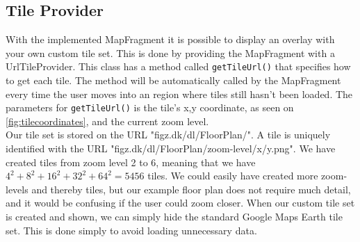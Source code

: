 \subsection*{Tile Provider}
With the implemented MapFragment it is possible to display an overlay with your own custom tile set. This is done by providing the MapFragment with a UrlTileProvider\citep{tilecoordinates}. This class has a method called \lstinline|getTileUrl()| that specifies how to get each tile. The method will be automatically called by the MapFragment every time the user moves into an region where tiles still hasn't been loaded. The parameters for \lstinline|getTileUrl()| is the tile's x,y coordinate, as seen on \autoref{fig:tilecoordinates}, and the current zoom level.\\
Our tile set is stored on the URL "figz.dk/dl/FloorPlan/". A tile is uniquely identified with the URL "figz.dk/dl/FloorPlan/zoom-level/x/y.png". We have created tiles from zoom level 2 to 6, meaning that we have $4^2+8^2+16^2+32^2+64^2 = 5456$ tiles. We could easily have created more zoom-levels and thereby tiles, but our example floor plan does not require much detail, and it would be confusing if the user could zoom closer. When our custom tile set is created and shown, we can simply hide the standard Google Maps Earth tile set. This is done simply to avoid loading unnecessary data.

